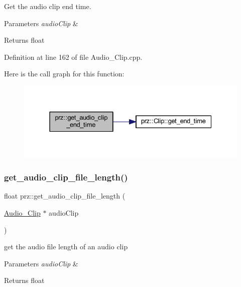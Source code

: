 Get the audio clip end time. 


\begin{DoxyParams}{Parameters}
{\em audio\+Clip} & \\
\hline
\end{DoxyParams}
\begin{DoxyReturn}{Returns}
float 
\end{DoxyReturn}


Definition at line 162 of file Audio\+\_\+\+Clip.\+cpp.

Here is the call graph for this function\+:
\nopagebreak
\begin{figure}[H]
\begin{center}
\leavevmode
\includegraphics[width=331pt]{namespaceprz_ab424e7684c53c76bd12b24e549df8d32_cgraph}
\end{center}
\end{figure}
\mbox{\label{namespaceprz_aa29f4f6bfb3146f21ba0e8e9a446fc11}} 
\subsubsection{\texorpdfstring{get\_audio\_clip\_file\_length()}{get\_audio\_clip\_file\_length()}}
{\footnotesize\ttfamily float prz\+::get\+\_\+audio\+\_\+clip\+\_\+file\+\_\+length (\begin{DoxyParamCaption}\item[{\mbox{\hyperlink{classprz_1_1_audio___clip}{Audio\+\_\+\+Clip}} $\ast$}]{audio\+Clip }\end{DoxyParamCaption})}



get the audio file length of an audio clip 


\begin{DoxyParams}{Parameters}
{\em audio\+Clip} & \\
\hline
\end{DoxyParams}
\begin{DoxyReturn}{Returns}
float 
\end{DoxyReturn}


